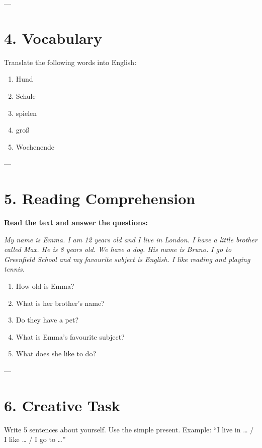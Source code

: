 ---
\newpage
\section*{4. Vocabulary}

Translate the following words into English:

\begin{multicols}{2}
\begin{enumerate}[resume]
  \item Hund \dotfill
  \item Schule \dotfill
  \item spielen \dotfill
  \item groß \dotfill
  \item Wochenende \dotfill
\end{enumerate}
\end{multicols}

---

\section*{5. Reading Comprehension}

\textbf{Read the text and answer the questions:}

\textit{My name is Emma. I am 12 years old and I live in London. I have a little brother called Max. He is 8 years old. We have a dog. His name is Bruno. I go to Greenfield School and my favourite subject is English. I like reading and playing tennis.}

\begin{enumerate}[resume]
  \item How old is Emma? \dotfill
  \item What is her brother’s name? \dotfill
  \item Do they have a pet? \dotfill
  \item What is Emma’s favourite subject? \dotfill
  \item What does she like to do? \dotfill
\end{enumerate}

---

\section*{6. Creative Task}

Write 5 sentences about yourself. Use the simple present.  
Example: “I live in … / I like … / I go to …”
